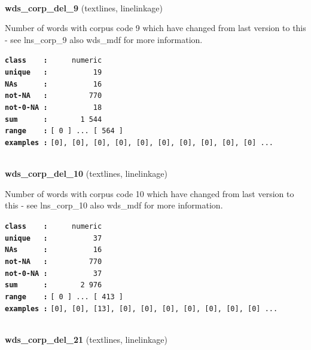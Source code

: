 \documentclass[]{article}
\begin{document}
~

\textbf{wds\_corp\_del\_9} (textlines, linelinkage)

Number of words with corpus code 9 which have changed from last version
to this - see lns\_corp\_9 also wds\_mdf for more information.

\textbf{\texttt{class\ \ \ \ :}} \texttt{~~~~~numeric}\\
\textbf{\texttt{unique\ \ \ :}} \texttt{~~~~~~~~~~19}\\
\textbf{\texttt{NAs\ \ \ \ \ \ :}} \texttt{~~~~~~~~~~16}\\
\textbf{\texttt{not-NA\ \ \ :}} \texttt{~~~~~~~~~770}\\
\textbf{\texttt{not-0-NA\ :}} \texttt{~~~~~~~~~~18}\\
\textbf{\texttt{sum\ \ \ \ \ \ :}} \texttt{~~~~~~~1~544}\\
\textbf{\texttt{range\ \ \ \ :}}
\texttt{{[}\ 0\ {]}\ ...\ {[}\ 564\ {]}}\\
\textbf{\texttt{examples\ :}}
\texttt{{[}0{]},\ {[}0{]},\ {[}0{]},\ {[}0{]},\ {[}0{]},\ {[}0{]},\ {[}0{]},\ {[}0{]},\ {[}0{]},\ {[}0{]}\ ...}\\

~

\textbf{wds\_corp\_del\_10} (textlines, linelinkage)

Number of words with corpus code 10 which have changed from last version
to this - see lns\_corp\_10 also wds\_mdf for more information.

\textbf{\texttt{class\ \ \ \ :}} \texttt{~~~~~numeric}\\
\textbf{\texttt{unique\ \ \ :}} \texttt{~~~~~~~~~~37}\\
\textbf{\texttt{NAs\ \ \ \ \ \ :}} \texttt{~~~~~~~~~~16}\\
\textbf{\texttt{not-NA\ \ \ :}} \texttt{~~~~~~~~~770}\\
\textbf{\texttt{not-0-NA\ :}} \texttt{~~~~~~~~~~37}\\
\textbf{\texttt{sum\ \ \ \ \ \ :}} \texttt{~~~~~~~2~976}\\
\textbf{\texttt{range\ \ \ \ :}}
\texttt{{[}\ 0\ {]}\ ...\ {[}\ 413\ {]}}\\
\textbf{\texttt{examples\ :}}
\texttt{{[}0{]},\ {[}0{]},\ {[}13{]},\ {[}0{]},\ {[}0{]},\ {[}0{]},\ {[}0{]},\ {[}0{]},\ {[}0{]},\ {[}0{]}\ ...}\\

~

\textbf{wds\_corp\_del\_21} (textlines, linelinkage)
\end{document}

